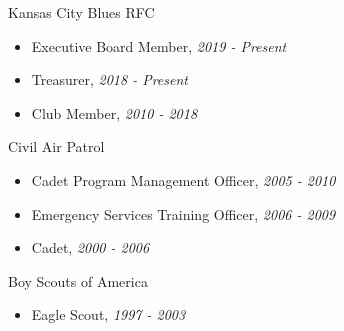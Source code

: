 
\Community
{Kansas City Blues RFC}
{\begin{itemize}
    \item Executive Board Member, \emph{2019 - Present}
    \item Treasurer, \emph{2018 - Present}
    \item Club Member, \emph{2010 - 2018}
\end{itemize}}

\vspace*{0.01 in}

\Community
{Civil Air Patrol}
{\begin{itemize}
    \item Cadet Program Management Officer, \emph{2005 - 2010}
    \item Emergency Services Training Officer, \emph{2006 - 2009}
    \item Cadet, \emph{2000 - 2006}
\end{itemize}}

\vspace*{0.01 in}

\Community
{Boy Scouts of America}
{\begin{itemize}
    \item Eagle Scout, \emph{1997 - 2003}
\end{itemize}}